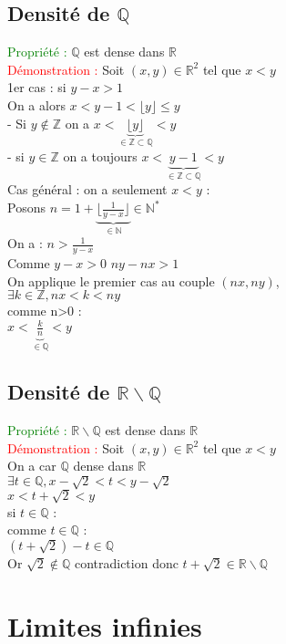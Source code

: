 \documentclass{article}
\begin{document}
	\subsection{Densité de $\mathbb{Q}$}
	\textcolor{green}{Propriété :} $\mathbb{Q}$ est dense dans $\mathbb{R}$ \\ 
	\textcolor{red}{Démonstration :} Soit $(x,y) \in \mathbb{R}^2$ tel que $x<y$ \\ 
	1er cas : si $y-x>1$ \\ 
	On a alors $x < y-1 < \lfloor y \rfloor \leq y$ \\ 
	- Si $y \notin \mathbb{Z}$ on a  $x < \underbrace{\lfloor y \rfloor}_{\in \mathbb{Z} \subset \mathbb{Q}} < y$ \\ 
	- si $y \in \mathbb{Z} $ on a toujours $x < \underbrace{ y -1}_{\in \mathbb{Z} \subset \mathbb{Q}} < y$ \\ 
	Cas général : on a seulement $x<y$ : \\ 
	Posons $n=1+\underbrace{\lfloor \frac{1}{y-x}\rfloor}_{\in \mathbb{N} } \in \mathbb{N}^*$ \\ 
	On a : $n > \frac{1}{y-x}$ \\ 
	Comme $y-x>0$ $ny-nx>1$ \\ 
	On applique le premier cas au couple $(nx,ny)$, \\ 
	$\exists k \in \mathbb{Z}, nx<k<ny$ \\ 
	comme n>0 : \\ 
	$x<\underbrace{\frac{k}{n}}_{\in \mathbb{Q}}<y$
	\subsection{Densité de $\mathbb{R} \backslash \mathbb{Q}$}
	\textcolor{green}{Propriété :} $\mathbb{R} \backslash \mathbb{Q} $ est dense dans $\mathbb{R}$ \\ 
	\textcolor{red}{Démonstration :} Soit $(x,y) \in \mathbb{R}^2$ tel que $x<y$ \\ 
	On a car $\mathbb{Q}$ dense dans $\mathbb{R}$ \\ 
	$\exists t \in \mathbb{Q}, x- \sqrt{2}<t<y-\sqrt 2$ \\ 
	$x<t+\sqrt 2< y$ \\ 
	si $t \in \mathbb{Q}$ : \\
	comme $t \in \mathbb{Q}$ : \\ 
	$(t+ \sqrt 2) -t \in \mathbb{Q}$ \\ 
	Or $\sqrt 2 \notin \mathbb{Q}$ contradiction donc $t+\sqrt 2 \in \mathbb{R} \backslash \mathbb{Q}$ 
	\section{Limites infinies}
\end{document}
